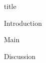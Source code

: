 \documentclass{article}[abstract=off]
\begin{document}
{title}

\frontmatter


\tableofcontents

\newpage


\mainmatter

{Introduction}
\label{intro}

{Main}
\label{main_part}

{Discussion}
\label{discussion}

\newpage
\newrefcontext[sorting=nyt] %
\printbibliography[heading = bibintoc, title = Bibliography]    %


\end{document}
